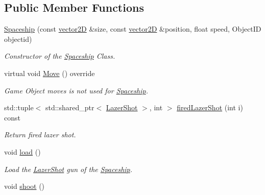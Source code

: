 \subsection*{Public Member Functions}
\begin{DoxyCompactItemize}
\item 
\mbox{\hyperlink{class_spaceship_a3fe713cbac3c0c20c298ab1d1aa13a71}{Spaceship}} (const \mbox{\hyperlink{classvector2_d}{vector2D}} \&size, const \mbox{\hyperlink{classvector2_d}{vector2D}} \&position, float speed, Object\+ID objectid)
\begin{DoxyCompactList}\small\item\em Constructor of the \mbox{\hyperlink{class_spaceship}{Spaceship}} Class. \end{DoxyCompactList}\item 
\mbox{\label{class_spaceship_ad82228c11cdc42ce2279756de72e134b}} 
virtual void \mbox{\hyperlink{class_spaceship_ad82228c11cdc42ce2279756de72e134b}{Move}} () override
\begin{DoxyCompactList}\small\item\em Game Object moves is not used for \mbox{\hyperlink{class_spaceship}{Spaceship}}. \end{DoxyCompactList}\item 
std\+::tuple$<$ std\+::shared\+\_\+ptr$<$ \mbox{\hyperlink{class_lazer_shot}{Lazer\+Shot}} $>$, int $>$ \mbox{\hyperlink{class_spaceship_aa8f630847912cacefb0f3494ae8d0480}{fired\+Lazer\+Shot}} (int i) const
\begin{DoxyCompactList}\small\item\em Return fired lazer shot. \end{DoxyCompactList}\item 
\mbox{\label{class_spaceship_ac14518da6eb7c15d5e34d65a9929dcdd}} 
void \mbox{\hyperlink{class_spaceship_ac14518da6eb7c15d5e34d65a9929dcdd}{load}} ()
\begin{DoxyCompactList}\small\item\em Load the \mbox{\hyperlink{class_lazer_shot}{Lazer\+Shot}} gun of the \mbox{\hyperlink{class_spaceship}{Spaceship}}. \end{DoxyCompactList}\item 
\mbox{\label{class_spaceship_af29256d4fa2c28f773dd26ce74c22d15}} 
void \mbox{\hyperlink{class_spaceship_af29256d4fa2c28f773dd26ce74c22d15}{shoot}} ()

\end{DoxyCompactItemize}
